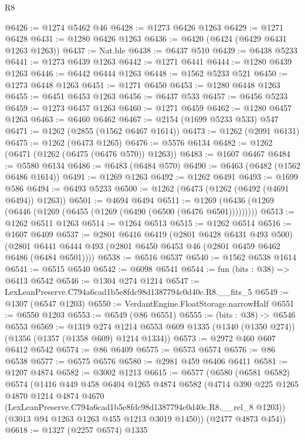 \begin{lexlean}{R8}
\begin{coremodule}
@6426 := @1274 @5462 @46
@6428 := @1273 @6426 @1263
@6429 := @1271 @6428
@6431 := @1280 @6426 @1263
@6436 := @6420 (@6424 (@6429 @6431 @1263 @1263))
@6437 := Nat.ble
@6438 := @6437 @510
@6439 := @6438 @5233
@6441 := @1273 @6439 @1263
@6442 := @1271 @6441
@6444 := @1280 @6439 @1263
@6446 := @6442 @6444 @1263
@6448 := @1562 @5233 @521
@6450 := @1273 @6448 @1263
@6451 := @1271 @6450
@6453 := @1280 @6448 @1263
@6455 := @6451 @6453 @1263
@6456 := @6437 @533
@6457 := @6456 @5233
@6459 := @1273 @6457 @1263
@6460 := @1271 @6459
@6462 := @1280 @6457 @1263
@6463 := @6460 @6462
@6467 := @2154 (@1699 @5233 @533) @547
@6471 := @1262 (@2855 (@1562 @6467 @1614))
@6473 := @1262 (@2091 @6131)
@6475 := @1262 (@6473 @1265)
@6476 := @5576 @6134
@6482 := @1262 (@6471 (@1262 (@6475 (@6476 @570)) @1263))
@6483 := @1607 @6467
@6484 := @5580 @6134
@6486 := @6483 (@6484 @570)
@6490 := @6463 (@6482 (@1562 @6486 @1614))
@6491 := @1269 @1263
@6492 := @1262 @6491
@6493 := @1699 @586
@6494 := @6493 @5233
@6500 := @1262 (@6473 (@1262 (@6492 (@4691 @6494)) @1263))
@6501 := @4694 @6494
@6511 := @1269 (@6436 (@1269 (@6446 (@1269 (@6455 (@1269 (@6490 (@6500 (@6476 @6501)))))))))
@6513 := @1262 @6511 @1263
@6514 := @1264 @6513
@6515 := @1262 @6514
@6516 := @1607 @6409
@6537 := @2801
    @6416
    @6419
    (@2801 @6428 @6431 @493 @500)
    (@2801 @6441 @6444 @493 (@2801 @6450 @6453 @46 (@2801 @6459 @6462 @6486 (@6484 @6501))))
@6538 := @6516 @6537
@6540 := @1562 @6538 @1614
@6541 := @6515 @6540
@6542 := @6098 @6541
@6544 := fun (bits : @38) => @6413 @6542
@6546 := @1304 @274 @1214
@6547 := LexLeanPreserve.C794a6cad1b5e8fdc98d1387794c0d40c.R8.__fits_5
@6549 := @1307 (@6547 @1203)
@6550 := VerdantEngine.FloatStorage.narrowHalf
@6551 := @6550 @1203
@6553 := @6549 (@86 @6551)
@6555 := (bits : @38) -> @6546 @6553
@6569 := @1319
    @274
    @1214
    @6553
    @609
    @1335
    (@1340 (@1350 @274))
    (@1356 (@1357 (@1358 @609) @1214 @1334))
@6573 := @2972 @460 @607 @6412 @6542
@6574 := @86 @6409
@6575 := @6573 @6574
@6576 := @86 @6538
@6577 := @6575 @6576
@6580 := @2981 @459 @6406 @6411
@6581 := @1207 @4874
@6582 := @3002 @1213
@6615 := @6577
    (@6580
      (@6581 @6582)
      @6574
      (@1416
        @449
        @458
        @6404
        @1265
        @4874
        @6582
        (@4714
          @390
          @225
          @1265
          @4870
          @1214
          @4874
          @4670
          (LexLeanPreserve.C794a6cad1b5e8fdc98d1387794c0d40c.R8.__rel_8 @1203))
        (@3013 @94 @1263 @1263 @455 @1213 @3019 @1450))
      (@2477 @4873 @454))
@6618 := @1327 (@2257 @6574) @1335

\end{coremodule}
\end{lexlean}
